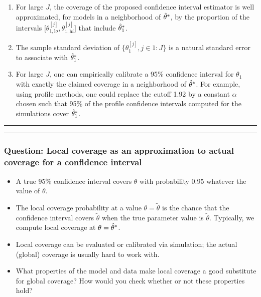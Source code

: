 \documentclass[]{article}
\providecommand{\tightlist}{%
  \setlength{\itemsep}{0pt}\setlength{\parskip}{0pt}}
\begin{document}
\begin{enumerate}
\def\labelenumi{(\Alph{enumi})}
\tightlist
\item
  For large \(J\), the coverage of the proposed confidence interval
  estimator is well approximated, for models in a neighborhood of
  \(\hat\theta^*\), by the proportion of the intervals
  \(\big[\theta^{[j]}_{1,\mathrm lo},\theta^{[j]}_{1,\mathrm hi}\big]\)
  that include \(\hat\theta_1^*\). 
\item
  The sample standard deviation of \(\{ \theta^{[j]}_1, j\in 1:J\}\) is
  a natural standard error to associate with
  \(\hat \theta_1^*\). 
\item
  For large \(J\), one can empirically calibrate a 95\% confidence
  interval for \(\theta_1\) with exactly the claimed coverage in a
  neighborhood of \(\hat\theta^*\). For example, using profile
  methods, one could replace the cutoff 1.92 by a constant \(\alpha\)
  chosen such that 95\% of the profile confidence intervals computed for
  the simulations cover \(\hat\theta_1^*\).
\end{enumerate}

\begin{center}\rule{0.5\linewidth}{\linethickness}\end{center}

\begin{center}\rule{0.5\linewidth}{\linethickness}\end{center}

\subsubsection{Question: Local coverage as an approximation to actual
coverage for a confidence
interval}\label{question-local-coverage-as-an-approximation-to-actual-coverage-for-a-confidence-interval}

\begin{itemize}
\item
  A true 95\% confidence interval covers \(\theta\) with probability
  0.95 whatever the value of \(\theta\).
\item
  The local coverage probability at a value \(\theta=\tilde\theta\) is
  the chance that the confidence interval covers \(\tilde\theta\) when
  the true parameter value is \(\tilde\theta\). Typically, we compute
  local coverage at \(\theta=\hat\theta^*\).
\item
  Local coverage can be evaluated or calibrated via simulation; the
  actual (global) coverage is usually hard to work with.
\item
  What properties of the model and data make local coverage a good
  substitute for global coverage? How would you check whether or not
  these properties hold?
\end{itemize}
\end{document}
